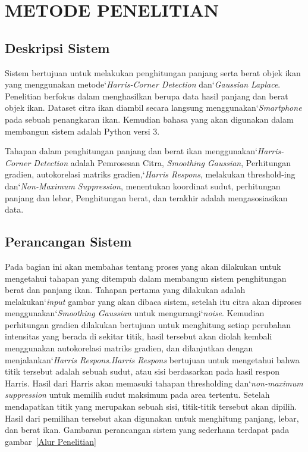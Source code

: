 
\chapter{METODE PENELITIAN}

\section{Deskripsi Sistem}
    Sistem bertujuan untuk melakukan penghitungan panjang serta berat objek ikan yang menggunakan
metode`\emph{Harris-Corner Detection} dan`\emph{Gaussian Laplace}. Penelitian berfokus dalam menghasilkan berupa
data hasil panjang dan berat objek ikan. Dataset citra ikan diambil secara langsung menggunakan`\emph{Smartphone} pada sebuah
penangkaran ikan. Kemudian bahasa yang akan digunakan dalam membangun sistem adalah Python versi 3.

Tahapan dalam penghitungan panjang dan berat ikan menggunakan`\emph{Harris-Corner Detection} adalah Pemrosesan Citra,
\emph{Smoothing Gaussian}, Perhitungan gradien, autokorelasi matriks gradien,`\emph{Harris Respons}, melakukan threshold-ing dan`\emph{Non-Maximum Suppression}, menentukan koordinat sudut, perhitungan panjang dan lebar, Penghitungan berat,
dan terakhir adalah mengasosiasikan data.

\section{Perancangan Sistem}
    Pada bagian ini akan membahas tentang proses yang akan dilakukan untuk mengetahui tahapan yang ditempuh
dalam membangun sistem penghitungan berat dan panjang ikan. Tahapan pertama yang dilakukan adalah melakukan`\emph{input} gambar
yang akan dibaca sistem, setelah itu citra akan diproses menggunakan`\emph{Smoothing Gaussian} untuk mengurangi`\emph{noise}. Kemudian perhitungan gradien dilakukan bertujuan untuk menghitung setiap perubahan intensitas yang berada di sekitar titik,
hasil tersebut akan diolah kembali menggunakan autokorelasi matriks gradien, dan dilanjutkan dengan menjalankan`\emph{Harris Respons}.\emph{Harris Respons} bertujuan untuk mengetahui bahwa titik tersebut adalah sebuah sudut, atau sisi berdasarkan pada hasil respon Harris.
Hasil dari Harris akan memasuki tahapan thresholding dan`\emph{non-maximum suppression} untuk memilih sudut maksimum pada area tertentu. Setelah mendapatkan titik yang merupakan sebuah sisi, titik-titik tersebut akan dipilih.
Hasil dari pemilihan tersebut akan digunakan untuk menghitung panjang, lebar, dan berat ikan. Gambaran perancangan sistem yang sederhana terdapat pada gambar~\ref*{Alur Penelitian}

